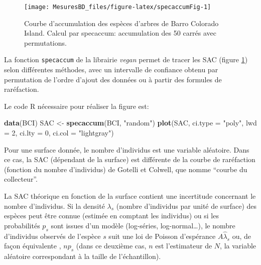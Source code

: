 \documentclass[
  11pt,
  french,
  a4paper,
  extrafontsizes,onecolumn,openright
  ]{memoir}
\newenvironment{Shaded}{\begin{snugshade}}{\end{snugshade}}
\newcommand{\AttributeTok}[1]{\textcolor[rgb]{0.13,0.29,0.53}{#1}}
\newcommand{\DecValTok}[1]{\textcolor[rgb]{0.00,0.00,0.81}{#1}}
\newcommand{\FunctionTok}[1]{\textcolor[rgb]{0.13,0.29,0.53}{\textbf{#1}}}
\newcommand{\NormalTok}[1]{#1}
\newcommand{\OtherTok}[1]{\textcolor[rgb]{0.56,0.35,0.01}{#1}}
\newcommand{\StringTok}[1]{\textcolor[rgb]{0.31,0.60,0.02}{#1}}
\newlength{\rf}
\begin{document}
\scriptsize

\begin{figure}

{\centering \texttt{[image: MesuresBD\_files/figure-latex/specaccumFig-1]} 

}

\caption{Courbe d'accumulation des espèces d'arbres de Barro Colorado Island. Calcul par specaccum: accumulation des 50 carrés avec permutations.}\label{fig:specaccumFig}
\end{figure}

\normalsize

La fonction \texttt{specaccum} de la librairie \emph{vegan} \autocite{Oksanen2012} permet de tracer les SAC (figure \ref{fig:specaccumFig}) selon différentes méthodes, avec un intervalle de confiance obtenu par permutation de l'ordre d'ajout des données ou à partir des formules de raréfaction.

Le code R nécessaire pour réaliser la figure est:

\scriptsize

\begin{Shaded}
\begin{Highlighting}[]
\FunctionTok{data}\NormalTok{(BCI)}
\NormalTok{SAC }\OtherTok{\textless{}{-}} \FunctionTok{specaccum}\NormalTok{(BCI, }\StringTok{"random"}\NormalTok{)}
\FunctionTok{plot}\NormalTok{(SAC, }\AttributeTok{ci.type =} \StringTok{"poly"}\NormalTok{, }\AttributeTok{lwd =} \DecValTok{2}\NormalTok{, }\AttributeTok{ci.lty =} \DecValTok{0}\NormalTok{, }\AttributeTok{ci.col =} \StringTok{"lightgray"}\NormalTok{)}
\end{Highlighting}
\end{Shaded}

\normalsize

Pour une surface donnée, le nombre d'individus est une variable aléatoire.
Dans ce cas, la SAC (dépendant de la surface) est différente de la courbe de raréfaction (fonction du nombre d'individus) de Gotelli et Colwell, que \textcite{Coleman1981} nomme ``courbe du collecteur''.

La SAC théorique en fonction de la surface contient une incertitude concernant le nombre d'individus.
Si la densité \(\lambda_s\) (nombre d'individus par unité de surface) des espèces peut être connue (estimée en comptant les individus) ou si les probabilités \(p_s\) sont issues d'un modèle (log-séries, log-normal\ldots), le nombre d'individus observés de l'espèce \(s\) suit une loi de Poisson d'espérance \(A\hat{\lambda}_s\) ou, de façon équivalente \autocite[pages 204-205]{Pielou1969}, \(np_s\) (dans ce deuxième cas, \(n\) est l'estimateur de \(N\), la variable aléatoire correspondant à la taille de l'échantillon).
\end{document}
